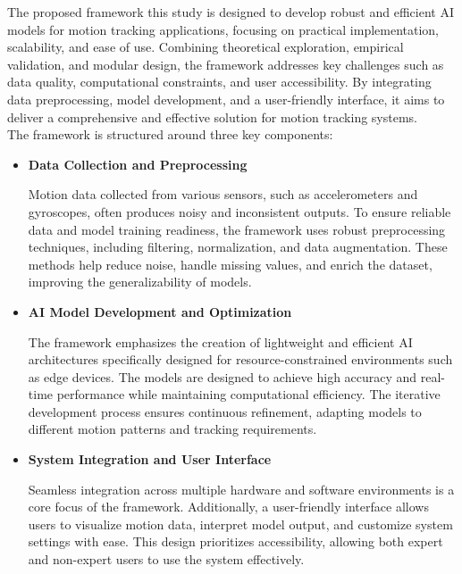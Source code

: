 
The proposed framework this study is designed to develop robust and efficient AI models for motion tracking applications, focusing on practical implementation, scalability, and ease of use. Combining theoretical exploration, empirical validation, and modular design, the framework addresses key challenges such as data quality, computational constraints, and user accessibility. By integrating data preprocessing, model development, and a user-friendly interface, it aims to deliver a comprehensive and effective solution for motion tracking systems.\\

The framework is structured around three key components:

\begin{itemize}
    \item \textbf{Data Collection and Preprocessing}
    
    Motion data collected from various sensors, such as accelerometers and gyroscopes, often produces noisy and inconsistent outputs. To ensure reliable data and model training readiness, the framework uses robust preprocessing techniques, including filtering, normalization, and data augmentation. These methods help reduce noise, handle missing values, and enrich the dataset, improving the generalizability of models.

    \item \textbf{AI Model Development and Optimization}
    
    The framework emphasizes the creation of lightweight and efficient AI architectures specifically designed for resource-constrained environments such as edge devices. The models are designed to achieve high accuracy and real-time performance while maintaining computational efficiency. The iterative development process ensures continuous refinement, adapting models to different motion patterns and tracking requirements.

    \item \textbf{System Integration and User Interface}

    Seamless integration across multiple hardware and software environments is a core focus of the framework. Additionally, a user-friendly interface allows users to visualize motion data, interpret model output, and customize system settings with ease. This design prioritizes accessibility, allowing both expert and non-expert users to use the system effectively.
\end{itemize}


